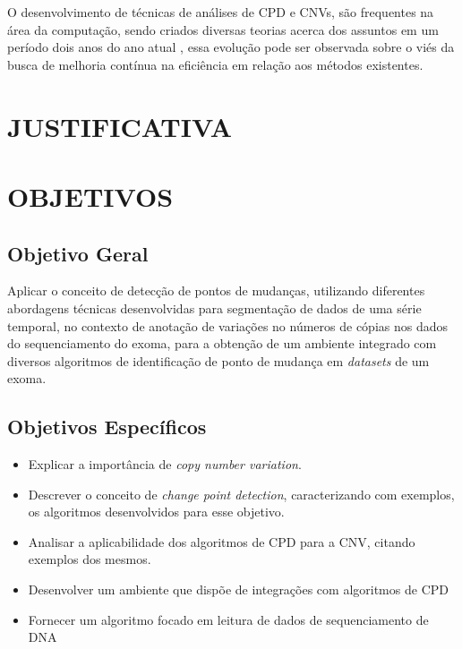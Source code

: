 O desenvolvimento de técnicas de análises de CPD e CNVs, são frequentes na área da computação, sendo criados diversas teorias acerca dos assuntos em um período dois anos do ano atual \cite{Girimurugan2018,Uzai2019,Chu2019}, essa evolução pode ser observada sobre o viés da busca de melhoria contínua na eficiência em relação aos métodos existentes.



\section{JUSTIFICATIVA}



\section{OBJETIVOS}

\subsection{Objetivo Geral}

Aplicar o conceito de detecção de pontos de mudanças, utilizando diferentes abordagens técnicas desenvolvidas para segmentação de dados de uma série temporal, no contexto de anotação de variações no números de cópias nos dados do sequenciamento do exoma, para a obtenção de um ambiente integrado com diversos algoritmos de identificação de ponto de mudança em \textit{datasets} de um exoma.

\subsection{Objetivos Específicos}
	
\begin{itemize}
    \item Explicar a importância de \textit{copy number variation}.
    \item Descrever o conceito de \textit{change point detection}, caracterizando com exemplos, os algoritmos desenvolvidos para esse objetivo.
    \item Analisar a aplicabilidade dos algoritmos de CPD para a CNV, citando exemplos dos mesmos.
    \item Desenvolver um ambiente que dispõe de integrações com algoritmos de CPD
    \item Fornecer um algoritmo focado em leitura de dados de sequenciamento de DNA
\end{itemize}

